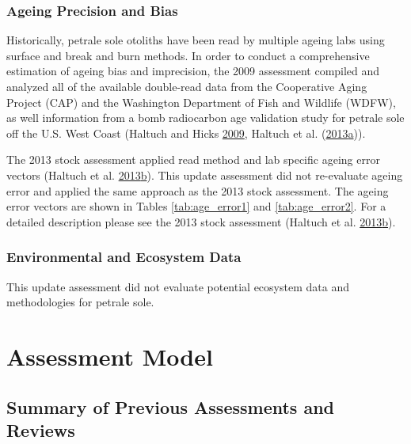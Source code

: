 \documentclass[12pt,]{article}
\begin{document}
\subsubsection{Ageing Precision and
Bias}\label{ageing-precision-and-bias}

Historically, petrale sole otoliths have been read by multiple ageing
labs using surface and break and burn methods. In order to conduct a
comprehensive estimation of ageing bias and imprecision, the 2009
assessment compiled and analyzed all of the available double-read data
from the Cooperative Aging Project (CAP) and the Washington Department
of Fish and Wildlife (WDFW), as well information from a bomb radiocarbon
age validation study for petrale sole off the U.S. West Coast (Haltuch
and Hicks \protect\hyperlink{ref-haltuch_status_2009}{2009}, Haltuch et
al.
(\protect\hyperlink{ref-haltuch_california_2013}{2013}\protect\hyperlink{ref-haltuch_california_2013}{a})).

The 2013 stock assessment applied read method and lab specific ageing
error vectors (Haltuch et al.
\protect\hyperlink{ref-haltuch_status_2013}{2013}\protect\hyperlink{ref-haltuch_status_2013}{b}).
This update assessment did not re-evaluate ageing error and applied the
same approach as the 2013 stock assessment. The ageing error vectors are
shown in Tables \ref{tab:age_error1} and \ref{tab:age_error2}. For a
detailed description please see the 2013 stock assessment (Haltuch et
al.
\protect\hyperlink{ref-haltuch_status_2013}{2013}\protect\hyperlink{ref-haltuch_status_2013}{b}).

\subsubsection{Environmental and Ecosystem
Data}\label{environmental-and-ecosystem-data}

This update assessment did not evaluate potential ecosystem data and
methodologies for petrale sole.

\section{Assessment Model}\label{assessment-model}

\subsection{Summary of Previous Assessments and
Reviews}\label{summary-of-previous-assessments-and-reviews}
\end{document}
